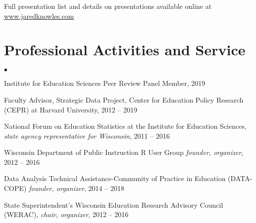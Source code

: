 \documentclass[margin,line]{res}
\newenvironment{list2}{
  \begin{list}{$\bullet$}{%
      \setlength{\itemsep}{0in}
      \setlength{\parsep}{0in} \setlength{\parskip}{0in}
      \setlength{\topsep}{0in} \setlength{\partopsep}{0in} 
      \setlength{\leftmargin}{0.2in}}}{\end{list}}
\begin{document}
\begin{resume}
% 



% 

Full presentation list and details on presentations available online at 
\url{www.jaredknowles.com}

% 
\section{\sc Professional Activities and Service}
% 
\begin{list2}
\item Institute for Education Sciences Peer Review Panel Member, 2019
\item Faculty Advisor, Strategic Data Project, Center for Education Policy Research (CEPR) at Harvard University, 2012 -- 2019
\item National Forum on Education Statistics at the Institute for Education Sciences, \emph{state agency representative for Wisconsin}, 2011 -- 2016
\item Wisconsin Department of Public Instruction R User Group \emph{founder, organizer}, 
2012 -- 2016 
\item Data Analysis Technical Assistance-Community of Practice in Education 
(DATA-COPE) \emph{founder, organizer}, 2014 -- 2018
\item State Superintendent's Wisconsin Education Research Advisory Council (WERAC), 
\emph{chair, organizer}, 2012 -- 2016
\end{list2}


\end{resume}
\end{document}
